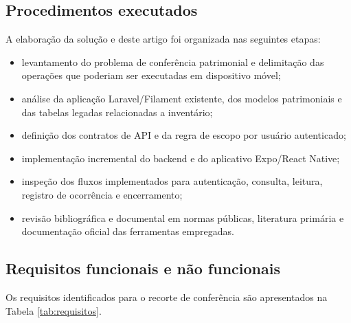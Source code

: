 \documentclass[12pt,a4paper]{article}
\begin{document}
\subsection{Procedimentos executados}

A elaboração da solução e deste artigo foi organizada nas seguintes etapas:

\begin{itemize}
  \item levantamento do problema de conferência patrimonial e delimitação das
  operações que poderiam ser executadas em dispositivo móvel;
  \item análise da aplicação Laravel/Filament existente, dos modelos
  patrimoniais e das tabelas legadas relacionadas a inventário;
  \item definição dos contratos de API e da regra de escopo por usuário
  autenticado;
  \item implementação incremental do backend e do aplicativo Expo/React
  Native;
  \item inspeção dos fluxos implementados para autenticação, consulta, leitura,
  registro de ocorrência e encerramento;
  \item revisão bibliográfica e documental em normas públicas, literatura
  primária e documentação oficial das ferramentas empregadas.
\end{itemize}

\subsection{Requisitos funcionais e não funcionais}

Os requisitos identificados para o recorte de conferência são apresentados na
Tabela \ref{tab:requisitos}.
\end{document}
